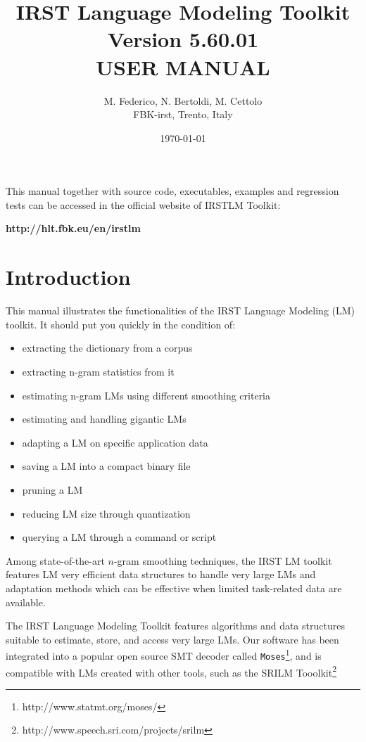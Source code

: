 \documentclass[11pt]{article}
\newcommand{\versionnumber}{5.60.01}
\begin{document}
   

\title{IRST Language Modeling Toolkit \\ Version \versionnumber\\USER MANUAL}
			         
\author{M. Federico, N. Bertoldi, M. Cettolo\\FBK-irst, Trento, Italy}			       
\date{\today}
 
\maketitle

\vspace*{3cm}
\noindent
This manual together with source code, executables, examples and regression tests can be accessed in the official website of IRSTLM Toolkit:

\bigskip
\centerline{\bf http://hlt.fbk.eu/en/irstlm}

\newpage
\section{Introduction}

This manual illustrates the functionalities of  the IRST Language  Modeling (LM)  toolkit. It  should  
put you quickly  in  the condition of:
\begin{itemize}
\item extracting the dictionary from a corpus
\item extracting n-gram statistics from it
\item estimating n-gram LMs using different smoothing criteria
\item estimating and handling gigantic LMs
\item adapting a LM on specific application data
\item saving a  LM into a compact binary file
\item pruning a LM
\item reducing LM size through quantization
\item querying a LM through a command or script
\end{itemize}

\noindent
Among  state-of-the-art  $n$-gram  smoothing  techniques,  the  IRST LM toolkit features LM  very efficient 
data structures to handle very large LMs and adaptation  methods which  can  be effective when limited task-related  data are available. 

The IRST Language Modeling Toolkit features algorithms and data structures suitable to estimate, 
store, and access very  large LMs.  Our software has been integrated into a popular open source 
SMT decoder  called {\tt Moses}\footnote{http://www.statmt.org/moses/}, and is compatible with LMs
created with other tools, such as the SRILM Tooolkit\footnote{http://www.speech.sri.com/projects/srilm}
\end{document}
